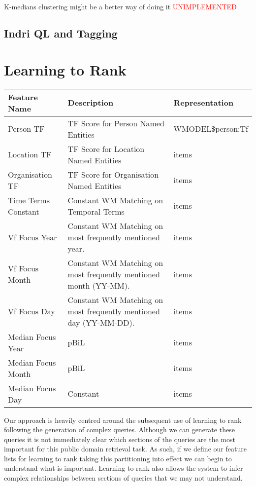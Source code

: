 \documentclass{mpaper}
\newcommand{\remove}[1]{\textcolor{red}{#1}}
\begin{document}
K-medians clustering might be a better way of doing it \remove{UNIMPLEMENTED}
\subsection{Indri QL and Tagging}

\section{Learning to Rank} \label{sec:l2r}
\begin{table*}[t] \label{table:features}
\centering
\begin{tabular}{|p{4cm}|p{6cm}|p{4cm}|}
\hline
Feature Name 		& Description  	& Representation \\ \hline
Person TF 			& TF Score for Person Named Entities 		& WMODEL\$person:Tf  \\ \hline
Location TF 		& TF Score for Location Named Entities 		& items  \\ \hline
Organisation TF 	& TF Score for Organisation Named Entities 		& items  \\ \hline
Time Terms Constant & Constant WM Matching on Temporal Terms			& items  \\ \hline
Vf Focus Year 		& Constant WM Matching on most frequently mentioned year. 		& items  \\ \hline
Vf Focus Month 		& Constant WM Matching on most frequently mentioned month (YY-MM).  		& items  \\ \hline
Vf Focus Day 		& Constant WM Matching on most frequently mentioned day (YY-MM-DD).  		& items  \\ \hline
Median Focus Year 	& pBiL 		& items  \\ \hline
Median Focus Month 	& pBiL 		& items  \\ \hline
Median Focus Day 	& Constant 		& items  \\ \hline
\end{tabular}
\end{table*}
Our approach is heavily centred around the subsequent use of learning to rank following the generation of complex queries.
Although we can generate these queries it is not immediately clear which sections of the queries are the most important for this public domain retrieval task.
As such, if we define our feature lists for learning to rank taking this partitioning into effect we can begin to understand what is important.
Learning to rank also allows the system to infer complex relationships between sections of queries that we may not understand.
\end{document}
